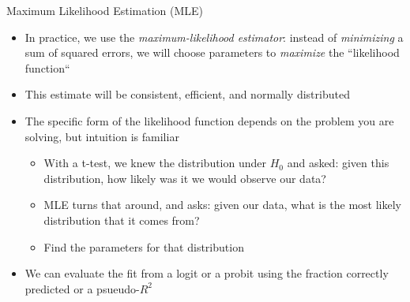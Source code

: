 \documentclass[aspectratio=169]{beamer}
\begin{document}
\begin{frame}{Maximum Likelihood Estimation (MLE)}
    \begin{itemize}
        \item In practice, we use the \textit{maximum-likelihood estimator}: instead of \textit{minimizing} a sum of squared errors, we will choose parameters to \textit{maximize} the ``likelihood function``
        \item This estimate will be consistent, efficient, and normally distributed 
        \item The specific form of the likelihood function depends on the problem you are solving, but intuition is familiar
        \begin{itemize}
            \item With a t-test, we knew the distribution under $H_0$ and asked: given this distribution, how likely was it we would observe our data?
            \item MLE turns that around, and asks: given our data, what is the most likely distribution that it comes from?
            \item Find the parameters for that distribution
        \end{itemize}
        \item We can evaluate the fit from a logit or a probit using the fraction correctly predicted or a psueudo-$R^2$
    \end{itemize}
\end{frame}

\end{document}
